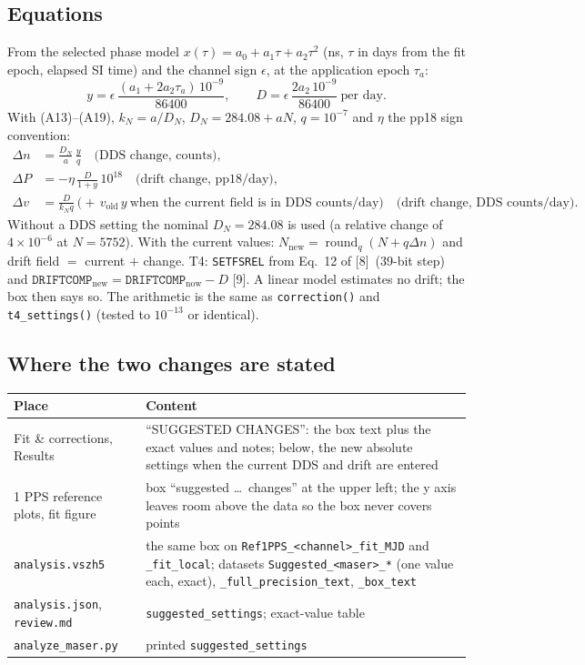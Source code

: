 \documentclass[11pt,a4paper]{article}
\newcommand{\tfourman}{[8]}
\newcommand{\tfournet}{[9]}
\begin{document}
\subsection{Equations}
From the selected phase model \(x(\tau)=a_0+a_1\tau+a_2\tau^2\) (ns, \(\tau\) in days from the fit
epoch, elapsed SI time) and the channel sign \(\epsilon\), at the application epoch \(\tau_a\):
\begin{equation}
y=\epsilon\,\frac{(a_1+2a_2\tau_a)\,10^{-9}}{86400},\qquad
D=\epsilon\,\frac{2a_2\,10^{-9}}{86400}\ \text{per day}. \tag{S1}
\end{equation}
With (A13)--(A19), \(k_N=a/D_N\), \(D_N=284.08+aN\), \(q=10^{-7}\) and \(\eta\) the pp18 sign
convention:
\begin{align}
\Delta n&=\frac{D_N}{a}\,\frac{y}{q}\quad\text{(DDS change, counts)},\tag{S2}\\
\Delta P&=-\eta\,\frac{D}{1+y}\,10^{18}\quad\text{(drift change, pp18/day)},\tag{S3}\\
\Delta v&=\frac{D}{k_N q}\ \bigl(+\,v_{\mathrm{old}}\,y\ \text{when the current field is in DDS counts/day}\bigr)
\quad\text{(drift change, DDS counts/day)}.\tag{S4}
\end{align}
Without a DDS setting the nominal \(D_N=284.08\) is used (a relative change of \(4\times10^{-6}\) at
\(N=5752\)). With the current values: \(N_{\mathrm{new}}=\operatorname{round}_q(N+q\Delta n)\) and
drift field \(=\) current \(+\) change. T4: \texttt{SETFSREL} from Eq.~12 of \tfourman\ (39-bit step) and
\(\mathtt{DRIFTCOMP}_{\mathrm{new}}=\mathtt{DRIFTCOMP}_{\mathrm{now}}-D\) \tfournet. A linear model
estimates no drift; the box then says so. The arithmetic is the same as \texttt{correction()} and
\texttt{t4\_settings()} (tested to \(10^{-13}\) or identical).

\subsection{Where the two changes are stated}
\begin{center}
\small
\begin{tabular}{@{}p{.3\linewidth}p{.62\linewidth}@{}}
\toprule
Place & Content\\
\midrule
Fit \& corrections, Results & ``SUGGESTED CHANGES'': the box text plus the exact values and notes;
below, the new absolute settings when the current DDS and drift are entered\\
1 PPS reference plots, fit figure & box ``suggested \ldots\ changes'' at the upper left; the y axis
leaves room above the data so the box never covers points\\
\texttt{analysis.vszh5} & the same box on \texttt{Ref1PPS\_<channel>\_fit\_MJD} and \texttt{\_fit\_local};
datasets \texttt{Suggested\_<maser>\_*} (one value each, exact), \texttt{\_full\_precision\_text},
\texttt{\_box\_text}\\
\texttt{analysis.json}, \texttt{review.md} & \texttt{suggested\_settings}; exact-value table\\
\texttt{analyze\_maser.py} & printed \texttt{suggested\_settings}\\
\bottomrule
\end{tabular}
\end{center}
\end{document}
